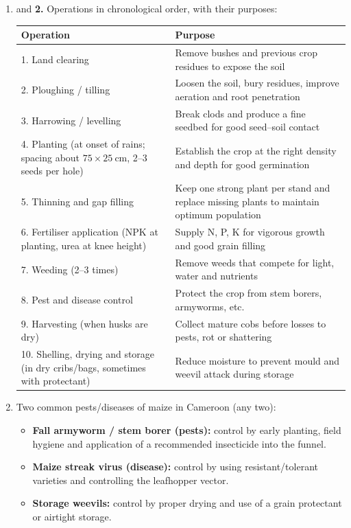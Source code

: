 \documentclass[11pt]{article}
\begin{document}
\begin{corrige}
\begin{enumerate}
\item and \textbf{2.} Operations in chronological order, with their purposes:
\begin{center}
\begin{tabularx}{\linewidth}{|l|X|}
\hline
\rowcolor{popblueL} \textbf{Operation} & \textbf{Purpose} \\
\hline
1. Land clearing & Remove bushes and previous crop residues to expose the soil \\
\hline
2. Ploughing / tilling & Loosen the soil, bury residues, improve aeration and root penetration \\
\hline
3. Harrowing / levelling & Break clods and produce a fine seedbed for good seed--soil contact \\
\hline
4. Planting (at onset of rains; spacing about $75 \times 25\ \mathrm{cm}$, 2--3 seeds per hole) & Establish the crop at the right density and depth for good germination \\
\hline
5. Thinning and gap filling & Keep one strong plant per stand and replace missing plants to maintain optimum population \\
\hline
6. Fertiliser application (NPK at planting, urea at knee height) & Supply N, P, K for vigorous growth and good grain filling \\
\hline
7. Weeding (2--3 times) & Remove weeds that compete for light, water and nutrients \\
\hline
8. Pest and disease control & Protect the crop from stem borers, armyworms, etc. \\
\hline
9. Harvesting (when husks are dry) & Collect mature cobs before losses to pests, rot or shattering \\
\hline
10. Shelling, drying and storage (in dry cribs/bags, sometimes with protectant) & Reduce moisture to prevent mould and weevil attack during storage \\
\hline
\end{tabularx}
\end{center}
\item Two common pests/diseases of maize in Cameroon (any two):
\begin{itemize}
\item \textbf{Fall armyworm / stem borer (pests):} control by early planting, field hygiene and application of a recommended insecticide into the funnel.
\item \textbf{Maize streak virus (disease):} control by using resistant/tolerant varieties and controlling the leafhopper vector.
\item \textbf{Storage weevils:} control by proper drying and use of a grain protectant or airtight storage.
\end{itemize}
\end{enumerate}
\end{corrige}
\end{document}

